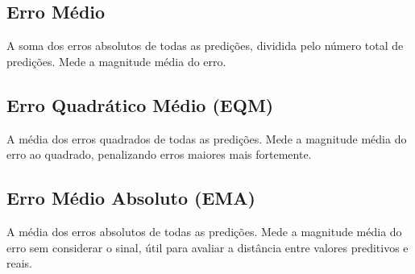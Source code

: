 \subsection{Erro Médio}
A soma dos erros absolutos de todas as predições, dividida pelo número total de predições. Mede a magnitude média do erro.

\subsection{Erro Quadrático Médio (EQM)}
A média dos erros quadrados de todas as predições. Mede a magnitude média do erro ao quadrado, penalizando erros maiores mais fortemente.

\subsection{Erro Médio Absoluto (EMA)}
A média dos erros absolutos de todas as predições. Mede a magnitude média do erro sem considerar o sinal, útil para avaliar a distância entre valores preditivos e reais.



%

\newpage